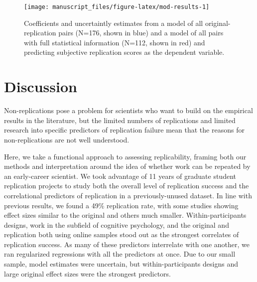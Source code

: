 \documentclass[
  english,
  a4paper,
]{article}
\begin{document}
\begin{figure}[ht]
\texttt{[image: manuscript\_files/figure-latex/mod-results-1]} \caption{Coefficients and uncertaintly estimates from a model of all original-replication pairs (N=176, shown in blue) and a model of all pairs with full statistical information (N=112, shown in red) and predicting subjective replication scores as the dependent variable. }\label{fig:mod-results}
\end{figure}

\hypertarget{discussion}{%
\section{Discussion}\label{discussion}}

Non-replications pose a problem for scientists who want to build on the empirical results in the literature, but the limited numbers of replications and limited research into specific predictors of replication failure mean that the reasons for non-replications are not well understood.

Here, we take a functional approach to assessing replicability, framing both our methods and interpretation around the idea of whether work can be repeated by an early-career scientist. We took advantage of 11 years of graduate student replication projects to study both the overall level of replication success and the correlational predictors of replication in a previously-unused dataset. In line with previous results, we found a 49\% replication rate, with some studies showing effect sizes similar to the original and others much smaller. Within-participants designs, work in the subfield of cognitive psychology, and the original and replication both using online samples stood out as the strongest correlates of replication success. As many of these predictors interrelate with one another, we ran regularized regressions with all the predictors at once. Due to our small sample, model estimates were uncertain, but within-participants designs and large original effect sizes were the strongest predictors.
\end{document}
